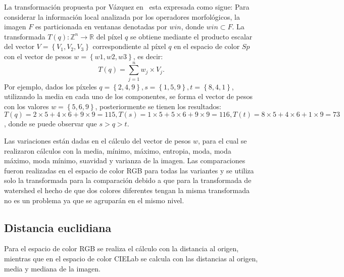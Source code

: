 La transformación propuesta por Vázquez en~\cite{noguera2014color} esta expresada como sigue: Para considerar la información local analizada por los operadores morfológicos, la imagen $F$ es particionada en ventanas denotadas por $win$, donde $win \subset F$. La transformada $T(q): \mathbb{Z}^{n}\rightarrow \mathbb{R}$ del píxel $q$ se obtiene mediante el producto escalar del vector $V = \left\{V_{1},V_{2},V_{3} \right\}$ correspondiente al píxel $q$ en el espacio de color $Sp$ con el vector de pesos $w = \left\{w1,w2,w3 \right\}$, es decir:
\begin{equation}
T\left(q\right) = \sum_{j=1}^n w_{j} \times V_{j}.
\end{equation}
Por ejemplo, dados los píxeles $q=\left\{2,4,9\right\}, s=\left\{1,5,9\right\}, t=\left\{8,4,1\right\}$, utilizando la media en cada uno de los componentes, se forma el vector de pesos con los valores $w=\left\{5,6,9\right\}$, posteriormente se tienen los resultados:
$T(q)=2\times5+4\times6+9\times9=115,
T(s)=1\times5+5\times6+9\times9=116,
T(t)=8\times5+4\times6+1\times9=73$, donde se puede observar que $s>q>t$.

Las variaciones están dadas en el cálculo del vector de pesos $w$, para el cual se realizaron cálculos con la media, mínimo, máximo, entropia, moda, moda máximo, moda mínimo, suavidad y varianza de la imagen. Las comparaciones fueron realizadas en el espacio de color RGB para todas las variantes y se utiliza solo la transformada para la comparación debido a que para la transformada de watershed el hecho de que dos colores diferentes tengan la misma transformada no es un problema ya que se agruparán en el mismo nivel.

\subsection{Distancia euclidiana}
\label{chap:marco-distanciaeuclidianta}
Para el espacio de color RGB se realiza el cálculo con la distancia al origen, mientras que en el espacio de color CIELab se calcula con las distancias al origen, media y mediana de la imagen. 

